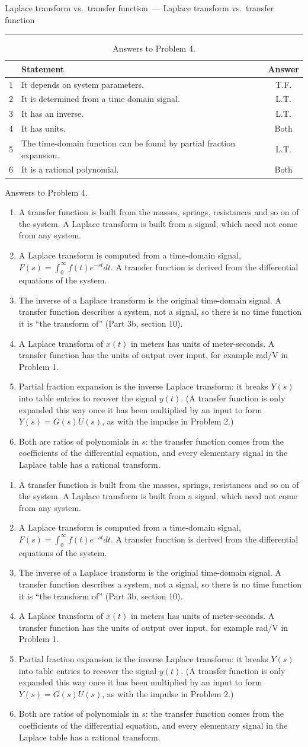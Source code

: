 \documentclass[11pt,letterpaper]{article}
\newcommand{\problem}[2]{%
  \bigskip
  \noindent{\large\bfseries Problem #1}%
  \ifx\relax#2\relax\else\ {\large --- #2}\fi
  \par\nobreak\vspace{2pt}\hrule\vspace{8pt}\nobreak
}
\newenvironment{answertable}[2]{%
  \def\anstabcap{#2}%
  \begin{table}[H]
  \centering
  \renewcommand{\arraystretch}{1.4}
  \begin{tabular}{#1}
}{%
  \end{tabular}
  \ifx\anstabcap\empty\else\caption{\anstabcap}\fi
  \end{table}%
}
\newcommand{\answer}[1]{%
  \ifx\relax#1\relax\todo{write the answer here}\else#1\fi
  \par\vspace{4pt}%
}
\newcommand{\todo}[1]{%
  \fbox{\parbox{0.9\linewidth}{\centering\vspace{10pt}\rmfamily\itshape\small
    #1\vspace{10pt}}}%
}
\begin{document}
\clearpage
\problem{4}{Laplace transform vs.\ transfer function}
\begin{answertable}{|c|l|c|}{Answers to Problem 4.}
  \hline
  & Statement & Answer \\ \hline\hline
  1 & It depends on system parameters. & T.F. \\ \hline
  2 & It is determined from a time domain signal. & L.T. \\ \hline
  3 & It has an inverse. & L.T. \\ \hline
  4 & It has units. & Both \\ \hline
  5 & The time-domain function can be found by partial fraction expansion. & L.T. \\ \hline
  6 & It is a rational polynomial. & Both \\ \hline
\end{answertable}
\answer{
    \begin{enumerate}
        \item A transfer function is built from the masses, springs,
              resistances and so on of the system. A Laplace transform is
              built from a signal, which need not come from any system.
        \item A Laplace transform is computed from a time-domain signal,
              $F(s) = \int_0^\infty f(t)e^{-st}dt$. A transfer function is
              derived from the differential equations of the system.
        \item The inverse of a Laplace transform is the original time-domain
              signal. A transfer function describes a system, not a signal,
              so there is no time function it is ``the transform of'' (Part
              3b, section 10).
        \item A Laplace transform of $x(t)$ in meters has units of
              meter-seconds. A transfer function has the units of output over
              input, for example rad/V in Problem 1.
        \item Partial fraction expansion is the inverse Laplace transform:
              it breaks $Y(s)$ into table entries to recover the signal
              $y(t)$. (A transfer function is only expanded this way once it
              has been multiplied by an input to form $Y(s) = G(s)U(s)$, as
              with the impulse in Problem 2.)
        \item Both are ratios of polynomials in $s$: the transfer function
              comes from the coefficients of the differential equation, and
              every elementary signal in the Laplace table has a rational
              transform.
    \end{enumerate}
}
\end{document}
